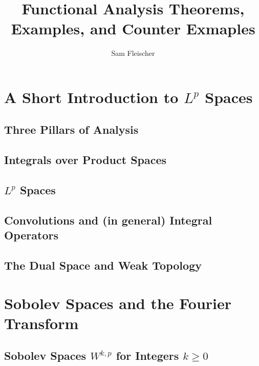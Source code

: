 \documentclass[12pt]{article}
\author{Sam Fleischer}
\title{Functional Analysis Theorems, Examples, and Counter Exmaples}
\begin{document}
\maketitle

\section{A Short Introduction to $L^p$ Spaces}

\subsection{Three Pillars of Analysis}

\subsection{Integrals over Product Spaces}

\subsection{$L^p$ Spaces}

\subsection{Convolutions and (in general) Integral Operators}

\subsection{The Dual Space and Weak Topology}

\section{Sobolev Spaces and the Fourier Transform}

\subsection{Sobolev Spaces $W^{k,p}$ for Integers $k \geq 0$}
\end{document}
